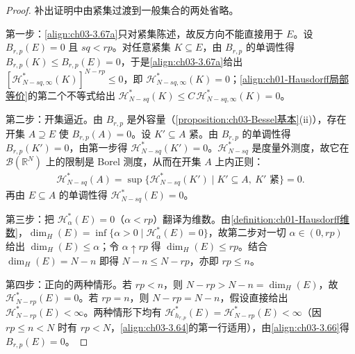 \documentclass[../../main.tex]{subfiles}%
\begin{document}
\begin{proof}
补出证明中由紧集过渡到一般集合的两处省略。

第一步：\eqref{align:ch03-3.67a}只对紧集陈述，故反方向不能直接用于 $E$。设 $B_{r,p}(E)=0$ 且 $sq<rp$。对任意紧集 $K\subseteq E$，由 $B_{r,p}$ 的单调性得 $B_{r,p}(K)\leqslant B_{r,p}(E)=0$，于是\eqref{align:ch03-3.67a}给出 $[\mathcal{H}^*_{N-sq,\infty}(K)]^{N-rp}\leqslant0$，即 $\mathcal{H}^*_{N-sq,\infty}(K)=0$；\eqref{align:ch01-Hausdorff局部等价}的第二个不等式给出 $\mathcal{H}^*_{N-sq}(K)\leqslant C\,\mathcal{H}^*_{N-sq,\infty}(K)=0$。

第二步：开集逼近。由 $B_{r,p}$ 是外容量（\cref{proposition:ch03-Bessel基本}(ii)），存在开集 $A\supseteq E$ 使 $B_{r,p}(A)=0$。设 $K'\subseteq A$ 紧。由 $B_{r,p}$ 的单调性得 $B_{r,p}(K')=0$，由第一步得 $\mathcal{H}^*_{N-sq}(K')=0$。$\mathcal{H}^*_{N-sq}$ 是度量外测度，故它在 $\mathcal{B}(\mathbb{R}^N)$ 上的限制是 Borel 测度，从而在开集 $A$ 上内正则：
\begin{align*}
\mathcal{H}^*_{N-sq}(A)=\sup\{\mathcal{H}^*_{N-sq}(K')\mid K'\subseteq A,\ K'\text{ 紧}\}=0.
\end{align*}
再由 $E\subseteq A$ 的单调性得 $\mathcal{H}^*_{N-sq}(E)=0$。

第三步：把 $\mathcal{H}^*_{\alpha}(E)=0$（$\alpha<rp$）翻译为维数。由\cref{definition:ch01-Hausdorff维数}，$\dim_H(E)=\inf\{\alpha>0\mid\mathcal{H}^*_{\alpha}(E)=0\}$，故第二步对一切 $\alpha\in(0,rp)$ 给出 $\dim_H(E)\leqslant\alpha$；令 $\alpha\uparrow rp$ 得 $\dim_H(E)\leqslant rp$。结合 $\dim_H(E)=N-n$ 即得 $N-n\leqslant N-rp$，亦即 $rp\leqslant n$。

第四步：正向的两种情形。若 $rp<n$，则 $N-rp>N-n=\dim_H(E)$，故 $\mathcal{H}^*_{N-rp}(E)=0$。若 $rp=n$，则 $N-rp=N-n$，假设直接给出 $\mathcal{H}^*_{N-rp}(E)<\infty$。两种情形下均有 $\mathcal{H}^*_{h_{r,p}}(E)=\mathcal{H}^*_{N-rp}(E)<\infty$（因 $rp\leqslant n<N$ 时有 $rp<N$，\eqref{align:ch03-3.64}的第一行适用），由\eqref{align:ch03-3.66}得 $B_{r,p}(E)=0$。
\end{proof}
\end{document}
